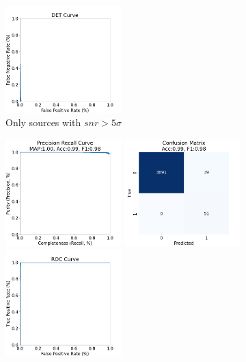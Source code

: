 \documentclass[DM,authoryear,toc]{lsstdoc}
\begin{document}
\begin{figure}[h]
  \includegraphics[width=0.4\textwidth]{det_13-resnet50-FullAugmentation-scratch-B64__0255000__npy_data_0.1.2-5sigma_256by256__posw_20.png}
  \caption{Only sources with $snr > 5\sigma$}
  \label{fig:tract_templates}
\end{figure}

\begin{figure}[h]
  \centering
  \includegraphics[width=0.4\textwidth]{precrec_13-resnet50-FullAugmentation-scratch-B64__0255000__npy_data_0.1.2-6sigma_256by256__posw_20.png}
  \includegraphics[width=0.4\textwidth]{confmat_13-resnet50-FullAugmentation-scratch-B64__0255000__npy_data_0.1.2-6sigma_256by256__posw_20.png}
  \includegraphics[width=0.4\textwidth]{roc_13-resnet50-FullAugmentation-scratch-B64__0255000__npy_data_0.1.2-6sigma_256by256__posw_20.png}

\end{figure}
\end{document}

